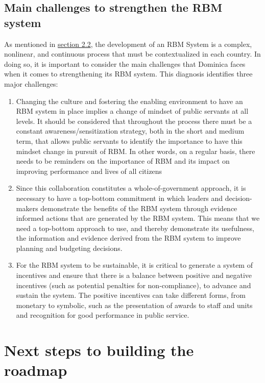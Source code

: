 \documentclass[
  10pt,
]{book}
\begin{document}
\hypertarget{main-challenges-to-strengthen-the-rbm-system}{%
\section{Main challenges to strengthen the RBM system}\label{main-challenges-to-strengthen-the-rbm-system}}

As mentioned in \protect\hyperlink{section2}{section 2.2}, the development of an RBM System is a complex, nonlinear, and continuous process that must be contextualized in each country. In doing so, it is important to consider the main challenges that Dominica faces when it comes to strengthening its RBM system. This diagnosis identifies three major challenges:

\begin{enumerate}
\def\labelenumi{\arabic{enumi}.}
\item
  Changing the culture and fostering the enabling environment to have an RBM system in place implies a change of mindset of public servants at all levels. It should be considered that throughout the process there must be a constant awareness/sensitization strategy, both in the short and medium term, that allows public servants to identify the importance to have this mindset change in pursuit of RBM. In other words, on a regular basis, there needs to be reminders on the importance of RBM and its impact on improving performance and lives of all citizens
\item
  Since this collaboration constitutes a whole-of-government approach, it is necessary to have a top-bottom commitment in which leaders and decision-makers demonstrate the benefits of the RBM system through evidence informed actions that are generated by the RBM system. This means that we need a top-bottom approach to use, and thereby demonstrate its usefulness, the information and evidence derived from the RBM system to improve planning and budgeting decisions.
\item
  For the RBM system to be sustainable, it is critical to generate a system of incentives and ensure that there is a balance between positive and negative incentives (such as potential penalties for non-compliance), to advance and sustain the system. The positive incentives can take different forms, from monetary to symbolic, such as the presentation of awards to staff and units and recognition for good performance in public service.
\end{enumerate}

\hypertarget{section6}{%
\chapter{Next steps to building the roadmap}\label{section6}}
\end{document}
